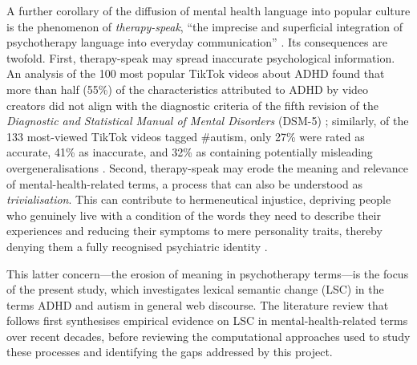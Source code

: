 A further corollary of the diffusion of mental health language into popular culture is the phenomenon of \textit{therapy-speak}, ``the imprecise and superficial integration of psychotherapy language into everyday communication'' \citep{isern-masUnmaskingTherapyspeak2025}. Its consequences are twofold. First, therapy-speak may spread inaccurate psychological information. An analysis of the 100 most popular TikTok videos about ADHD found that more than half (55\%) of the characteristics attributed to ADHD by video creators did not align with the diagnostic criteria of the fifth revision of the \textit{Diagnostic and Statistical Manual of Mental Disorders} (DSM-5) \citep{devriesExploringConceptCreep2025}; similarly, of the 133 most-viewed TikTok videos tagged \#autism, only 27\% were rated as accurate, 41\% as inaccurate, and 32\% as containing potentially misleading overgeneralisations \citep{aragon-guevaraReachAccuracyInformation2025}. Second, therapy-speak may erode the meaning and relevance of mental-health-related terms, a process that can also be understood as \textit{trivialisation}. This can contribute to hermeneutical injustice, depriving people who genuinely live with a condition of the words they need to describe their experiences \citep{isern-masUnmaskingTherapyspeak2025} and reducing their symptoms to mere personality traits, thereby denying them a fully recognised psychiatric identity \citep{spencerIsntEveryoneLittle2021}.

This latter concern---the erosion of meaning in psychotherapy terms---is the focus of the present study, which investigates lexical semantic change (LSC) in the terms ADHD and autism in general web discourse. The literature review that follows first synthesises empirical evidence on LSC in mental-health-related terms over recent decades, before reviewing the computational approaches used to study these processes and identifying the gaps addressed by this project.
